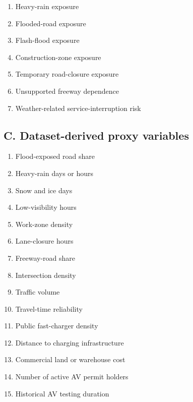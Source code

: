 \documentclass[10pt,a4paper]{article}
\providecommand{\tightlist}{\setlength{\itemsep}{0pt}\setlength{\parskip}{0pt}}
\begin{document}
\begin{enumerate}
\def\labelenumi{\arabic{enumi}.}
\tightlist
\item
  Heavy-rain exposure\\
\item
  Flooded-road exposure\\
\item
  Flash-flood exposure\\
\item
  Construction-zone exposure\\
\item
  Temporary road-closure exposure\\
\item
  Unsupported freeway dependence\\
\item
  Weather-related service-interruption risk
\end{enumerate}

\hypertarget{c.-dataset-derived-proxy-variables}{%
\subsection{C. Dataset-derived proxy variables}\label{c.-dataset-derived-proxy-variables}}

\begin{enumerate}
\def\labelenumi{\arabic{enumi}.}
\tightlist
\item
  Flood-exposed road share\\
\item
  Heavy-rain days or hours\\
\item
  Snow and ice days\\
\item
  Low-visibility hours\\
\item
  Work-zone density\\
\item
  Lane-closure hours\\
\item
  Freeway-road share\\
\item
  Intersection density\\
\item
  Traffic volume\\
\item
  Travel-time reliability\\
\item
  Public fast-charger density\\
\item
  Distance to charging infrastructure\\
\item
  Commercial land or warehouse cost\\
\item
  Number of active AV permit holders\\
\item
  Historical AV testing duration
\end{enumerate}
\end{document}

